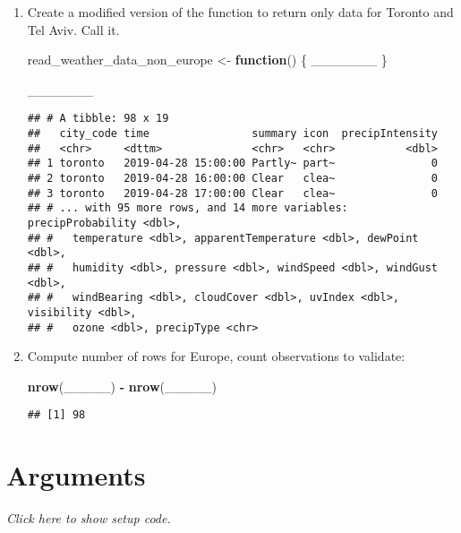 \documentclass[]{book}
\newenvironment{Shaded}{\begin{snugshade}}{\end{snugshade}}
\newcommand{\ControlFlowTok}[1]{\textcolor[rgb]{0.13,0.29,0.53}{\textbf{#1}}}
\newcommand{\KeywordTok}[1]{\textcolor[rgb]{0.13,0.29,0.53}{\textbf{#1}}}
\newcommand{\NormalTok}[1]{#1}
\newcommand{\OperatorTok}[1]{\textcolor[rgb]{0.81,0.36,0.00}{\textbf{#1}}}
\newcommand{\StringTok}[1]{\textcolor[rgb]{0.31,0.60,0.02}{#1}}
\begin{document}
\begin{enumerate}
\def\labelenumi{\arabic{enumi}.}
\item
  Create a modified version of the function to return only data for Toronto and Tel Aviv. Call it.

\begin{Shaded}
\begin{Highlighting}[]
\NormalTok{read_weather_data_non_europe <-}\StringTok{ }\ControlFlowTok{function}\NormalTok{() \{}
\NormalTok{  _______}
\NormalTok{\}}

\NormalTok{_______}
\end{Highlighting}
\end{Shaded}

\begin{verbatim}
## # A tibble: 98 x 19
##   city_code time                summary icon  precipIntensity
##   <chr>     <dttm>              <chr>   <chr>           <dbl>
## 1 toronto   2019-04-28 15:00:00 Partly~ part~               0
## 2 toronto   2019-04-28 16:00:00 Clear   clea~               0
## 3 toronto   2019-04-28 17:00:00 Clear   clea~               0
## # ... with 95 more rows, and 14 more variables: precipProbability <dbl>,
## #   temperature <dbl>, apparentTemperature <dbl>, dewPoint <dbl>,
## #   humidity <dbl>, pressure <dbl>, windSpeed <dbl>, windGust <dbl>,
## #   windBearing <dbl>, cloudCover <dbl>, uvIndex <dbl>, visibility <dbl>,
## #   ozone <dbl>, precipType <chr>
\end{verbatim}
\item
  Compute number of rows for Europe, count observations to validate:

\begin{Shaded}
\begin{Highlighting}[]
\KeywordTok{nrow}\NormalTok{(_____) }\OperatorTok{-}\StringTok{ }\KeywordTok{nrow}\NormalTok{(_____)}
\end{Highlighting}
\end{Shaded}

\begin{verbatim}
## [1] 98
\end{verbatim}
\end{enumerate}

\hypertarget{args}{%
\section{Arguments}\label{args}}

\emph{Click here to show setup code.}
\end{document}
